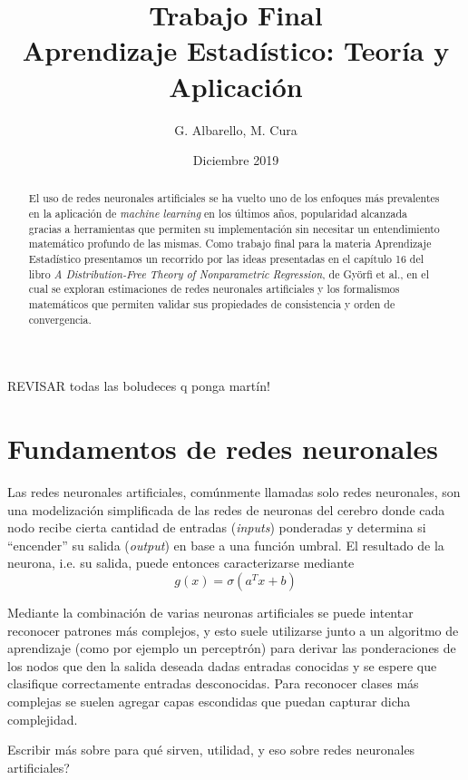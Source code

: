 \documentclass[12pt]{extarticle}
\title{Trabajo Final \\ Aprendizaje Estadístico: Teoría y Aplicación}
\author{G. Albarello, M. Cura}
\date{Diciembre 2019}
\newenvironment{comentarios_meta}
    {\begin{framed}\noindent\textcolor{red}{\textbf{//}}}
    {\end{framed}}
\begin{document}
\maketitle

\begin{comentarios_meta}
    REVISAR todas las boludeces q ponga martín!
\end{comentarios_meta}

\begin{abstract}
    El uso de redes neuronales artificiales se ha vuelto uno de los enfoques más prevalentes en la aplicación de \textit{machine learning} en los últimos años, popularidad alcanzada gracias a herramientas que permiten su implementación sin necesitar un entendimiento matemático profundo de las mismas. Como trabajo final para la materia Aprendizaje Estadístico presentamos un recorrido por las ideas presentadas en el capítulo 16 del libro \textit{A Distribution-Free Theory of Nonparametric Regression}, de Györfi et al., en el cual se exploran estimaciones de redes neuronales artificiales y los formalismos matemáticos que permiten validar sus propiedades de consistencia y orden de convergencia.
\end{abstract}


\section{Fundamentos de redes neuronales}

    Las redes neuronales artificiales, comúnmente llamadas solo redes neuronales, son una modelización simplificada de las redes de neuronas del cerebro donde cada nodo recibe cierta cantidad de entradas (\textit{inputs}) ponderadas y determina si ``encender'' su salida (\textit{output}) en base a una función umbral. El resultado de la neurona, i.e. su salida, puede entonces caracterizarse mediante
    \begin{equation*}    
        g(x) = \sigma(a^T x + b)
    \end{equation*}

    Mediante la combinación de varias neuronas artificiales se puede intentar reconocer patrones más complejos, y esto suele utilizarse junto a un algoritmo de aprendizaje (como por ejemplo un perceptrón) para derivar las ponderaciones de los nodos que den la salida deseada dadas entradas conocidas y se espere que clasifique correctamente entradas desconocidas. Para reconocer clases más complejas se suelen agregar capas escondidas que puedan capturar dicha complejidad.
    \begin{comentarios_meta}
        Escribir más sobre para qué sirven, utilidad, y eso sobre redes neuronales artificiales?
    \end{comentarios_meta}
    
\end{document}
